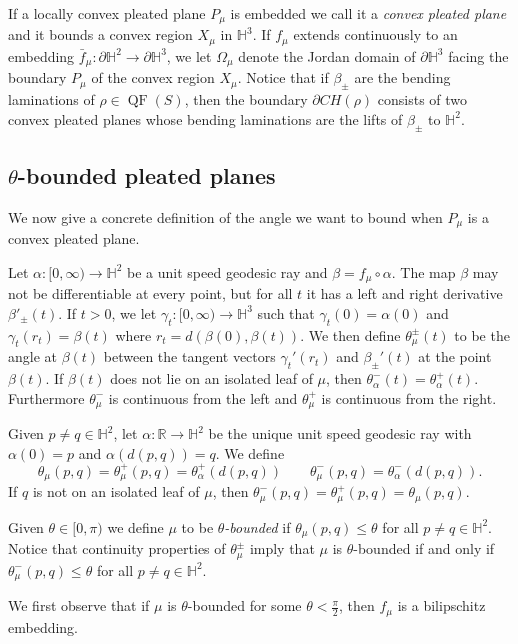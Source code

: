 \documentclass{amsart}
\theoremstyle{plain}
\theoremstyle{definition}
\theoremstyle{remark}
\newcommand{\R}{\mathbb R}
\newcommand{\Hp}{{\mathbb H}^2}
\newcommand{\QF}{\operatorname{QF}}
\newcommand{\<}{\left <}
\renewcommand{\>}{\right >}
\begin{document}
If a locally convex pleated plane $P_\mu$ is embedded we call it a {\em convex pleated plane} and it bounds a convex region $X_\mu$ in
$\mathbb H^3$. If $f_\mu$ extends continuously to an embedding
$\bar f_\mu:\partial\mathbb H^2\to\partial\mathbb  H^3$, we let  $\Omega_\mu$ denote the Jordan domain of $\partial\mathbb H^3$ facing
the boundary $P_\mu$  of the convex region $X_\mu$.  Notice that if $\beta_\pm$ are the bending laminations of $\rho\in \QF(S)$, 
then the boundary $\partial CH(\rho)$ consists of
two convex pleated planes whose bending laminations are the lifts of $\beta_\pm$ to $\mathbb H^2$.


\subsection{$\theta$-bounded pleated planes}
We now give a concrete definition of the angle we want to bound when $P_\mu$ is a convex pleated plane.

Let $\alpha:[0,\infty)\to\Hp$ be  a unit speed geodesic ray and $\beta = f_\mu\circ \alpha$.   The map $\beta$ may not be differentiable at every point,
but for all $t$ it has a left and right derivative $\beta'_\pm(t)$. If $t>0$, we let $\gamma_t:[0,\infty)\to \mathbb H^3$ such that
$\gamma_t(0)=\alpha(0)$ and $\gamma_t(r_t)=\beta(t)$ where $r_t=d(\beta(0),\beta(t))$. We then define
$\theta^\pm_\mu(t)$ to be the angle at $\beta(t)$ between the tangent vectors $\gamma_t'(r_t)$
and $\beta_\pm'(t)$ at the point $\beta(t)$.
If $\beta(t)$ does not lie on an isolated leaf of $\mu$, then $\theta_\alpha^-(t) = \theta^+_\alpha(t)$. 
Furthermore $\theta_\mu^-$ is continuous from the left and $\theta^+_\mu$ is continuous from the right.

Given $p\ne q\in\Hp$, let $\alpha:\R\to \Hp$ be the unique unit speed geodesic ray with $\alpha(0) = p$ and $\alpha(d(p,q)) = q$. We define
$$\theta_\mu(p,q) = \theta^+_\mu(p,q) = \theta^+_\alpha(d(p,q)) \qquad \theta^-_\mu(p,q) =  \theta^-_\alpha(d(p,q)).$$
If $q$ is not on an isolated leaf of $\mu$, then $\theta^-_\mu(p,q) = \theta^+_\mu(p,q)= \theta_\mu(p,q)$. 

Given $\theta \in [0,\pi)$ we define $\mu$ to be {\em $\theta$-bounded} if $\theta_\mu(p,q) \le \theta$ for all $p\ne q\in\Hp$. Notice that  continuity
properties of $\theta_\mu^{\pm}$ imply that $\mu$ is $\theta$-bounded  if and only if 
$\theta^{-}_\mu(p,q) \le \theta$ for all $p\ne q\in\Hp$.
 
We first observe that if $\mu$ is $\theta$-bounded for some $\theta<\frac{\pi}{2}$, then $f_\mu$ is a bilipschitz embedding.
\end{document}
